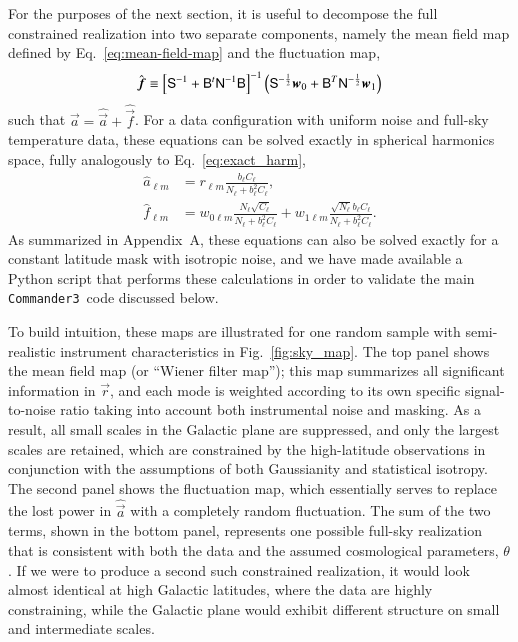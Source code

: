 \documentclass[twocolumn]{../common/aa}
\def\commanderthree{\texttt{Commander3}}
\newcommand{\B}[0]{\tens{B}}
\renewcommand{\a}[0]{\vec{a}}
\newcommand{\f}[0]{\vec{f}}
\newcommand{\N}[0]{\tens{N}}
\newcommand{\w}[0]{\vec{w}}
\renewcommand{\S}[0]{\tens{S}}
\renewcommand{\r}[0]{\vec{r}}
\begin{document}
For the purposes of the next section, it is useful to decompose the full constrained realization into two separate components, namely the mean field map defined by Eq.~\eqref{eq:mean-field-map} and the fluctuation map, 
\begin{equation}
\label{eq:fluc-map}
\hat{\f} \equiv \left[\S^{-1} + \B^t \N^{-1}\B \right]^{-1} \left(\S^{-\frac{1}{2}}\w_0 +\B^T \N^{-\frac{1}{2}}\w_1 \right)
\end{equation}
such that $\a = \hat{\a} + \hat{\f}$. For a data configuration with uniform noise and full-sky temperature data, these equations can be solved exactly in spherical harmonics space, fully analogously to Eq.~\eqref{eq:exact_harm},
\begin{align}
    \label{eq:hat_s_approx}
    \hat{a}_{\ell m} &= r_{\ell m}\frac{b_{\ell}C_{\ell}}{N_\ell + b_{\ell}^2C_{\ell}},\\
    \label{eq:hat_f_approx}
    \hat{f}_{\ell m} &= w_{0\ell m}\frac{N_{\ell}\sqrt{C_{\ell}}}{N_\ell + b_{\ell}^2C_{\ell}}+w_{1\ell m}\frac{\sqrt{N_{\ell}}b_{\ell}C_\ell}{N_\ell + b_{\ell}^2C_{\ell}}.
\end{align}
As summarized in Appendix~A, these equations can also be solved exactly for a constant latitude mask with isotropic noise, and we have made available a Python script that performs these calculations in order to validate the main \commanderthree\ code discussed below.

To build intuition, these maps are illustrated for one random sample with semi-realistic instrument characteristics in Fig.~\ref{fig:sky_map}. The top panel shows the mean field map (or ``Wiener filter map''); this map summarizes all significant information in $\r$, and each mode is weighted according to its own specific signal-to-noise ratio taking into account both instrumental noise and masking. As a result, all small scales in the Galactic plane are suppressed, and only the largest scales are retained, which are constrained by the high-latitude observations in conjunction with the assumptions of both Gaussianity and statistical isotropy. The second panel shows the fluctuation map, which essentially serves to replace the lost power in $\hat{\a}$ with a completely random fluctuation. The sum of the two terms, shown in the bottom panel, represents one possible full-sky realization that is consistent with both the data and the assumed cosmological parameters, $\theta$. If we were to produce a second such constrained realization, it would look almost identical at high Galactic latitudes, where the data are highly constraining, while the Galactic plane would exhibit different structure on small and intermediate scales.
\end{document}
